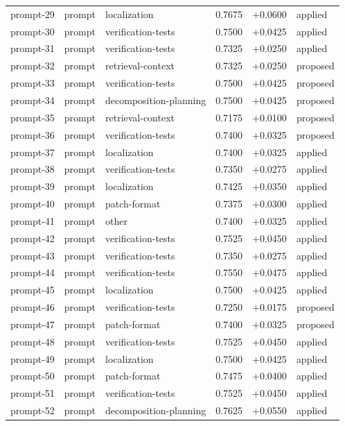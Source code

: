 \begin{center}
\begin{longtable}{llp{5.2cm}rrl}
prompt-29 & prompt & localization & 0.7675 & +0.0600 & applied \\
prompt-30 & prompt & verification-tests & 0.7500 & +0.0425 & applied \\
prompt-31 & prompt & verification-tests & 0.7325 & +0.0250 & applied \\
prompt-32 & prompt & retrieval-context & 0.7325 & +0.0250 & proposed \\
prompt-33 & prompt & verification-tests & 0.7500 & +0.0425 & proposed \\
prompt-34 & prompt & decomposition-planning & 0.7500 & +0.0425 & proposed \\
prompt-35 & prompt & retrieval-context & 0.7175 & +0.0100 & proposed \\
prompt-36 & prompt & verification-tests & 0.7400 & +0.0325 & proposed \\
prompt-37 & prompt & localization & 0.7400 & +0.0325 & applied \\
prompt-38 & prompt & verification-tests & 0.7350 & +0.0275 & applied \\
prompt-39 & prompt & localization & 0.7425 & +0.0350 & applied \\
prompt-40 & prompt & patch-format & 0.7375 & +0.0300 & applied \\
prompt-41 & prompt & other & 0.7400 & +0.0325 & applied \\
prompt-42 & prompt & verification-tests & 0.7525 & +0.0450 & applied \\
prompt-43 & prompt & verification-tests & 0.7350 & +0.0275 & applied \\
prompt-44 & prompt & verification-tests & 0.7550 & +0.0475 & applied \\
prompt-45 & prompt & localization & 0.7500 & +0.0425 & applied \\
prompt-46 & prompt & verification-tests & 0.7250 & +0.0175 & proposed \\
prompt-47 & prompt & patch-format & 0.7400 & +0.0325 & proposed \\
prompt-48 & prompt & verification-tests & 0.7525 & +0.0450 & applied \\
prompt-49 & prompt & localization & 0.7500 & +0.0425 & applied \\
prompt-50 & prompt & patch-format & 0.7475 & +0.0400 & applied \\
prompt-51 & prompt & verification-tests & 0.7525 & +0.0450 & applied \\
prompt-52 & prompt & decomposition-planning & 0.7625 & +0.0550 & applied \\

\end{longtable}
\end{center}

